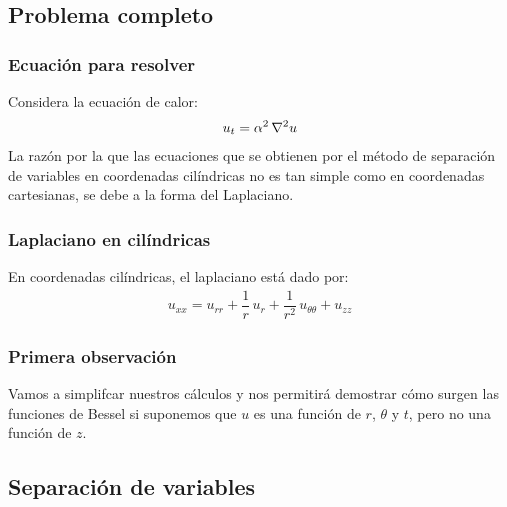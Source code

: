 \documentclass[12pt]{beamer}
\begin{document}
\subsection{Problema completo}

\begin{frame}
\frametitle{Ecuación para resolver}
Considera la ecuación de calor:
\pause
\begin{align*}
u_{t} =  \alpha^{2} \,  \laplacian{u}
\end{align*}
La razón por la que las ecuaciones que se obtienen por el método de separación de variables en coordenadas cilíndricas no es tan simple como en coordenadas cartesianas, se debe a la forma del Laplaciano. 
\end{frame}
\begin{frame}
\frametitle{Laplaciano en cilíndricas}
En coordenadas cilíndricas, el laplaciano está dado por:
\pause
\begin{align*}
u_{xx} = u_{rr} + \dfrac{1}{r} \, u_{r} + \dfrac{1}{r^{2}} \, u_{\theta \theta} + u_{zz}
\end{align*}
\end{frame}
\begin{frame}
\frametitle{Primera observación}
Vamos a simplifcar nuestros cálculos y nos permitirá demostrar cómo surgen las funciones de Bessel si suponemos que $u$ es una función de $r$, $\theta$ y $t$, pero no una función de $z$.
\end{frame}

\subsection{Separación de variables}
\end{document}
